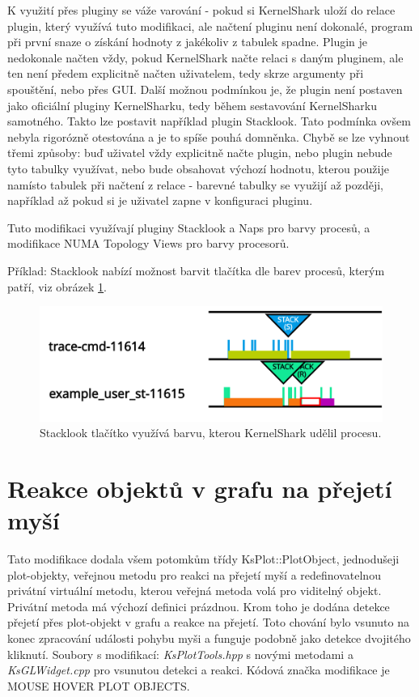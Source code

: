 K využití přes pluginy se váže varování - pokud si KernelShark uloží do relace plugin, který využívá tuto modifikaci, ale načtení pluginu není dokonalé, program při první snaze o získání hodnoty z jakékoliv z tabulek spadne. Plugin je nedokonale načten vždy, pokud KernelShark načte relaci s daným pluginem, ale ten není předem explicitně načten uživatelem, tedy skrze argumenty při spouštění, nebo přes GUI. Další možnou podmínkou je, že plugin není postaven jako oficiální pluginy KernelSharku, tedy během sestavování KernelSharku samotného. Takto lze postavit například plugin Stacklook. Tato podmínka ovšem nebyla rigorózně otestována a je to spíše pouhá domněnka. Chybě se lze vyhnout třemi způsoby: buď uživatel vždy explicitně načte plugin, nebo plugin nebude tyto tabulky využívat, nebo bude obsahovat výchozí hodnotu, kterou použije namísto tabulek při načtení z relace - barevné tabulky se využijí až později, například až pokud si je uživatel zapne v konfiguraci pluginu.

Tuto modifikaci využívají pluginy Stacklook a Naps pro barvy procesů, a modifikace NUMA Topology Views pro barvy procesorů.

Příklad: Stacklook nabízí možnost barvit tlačítka dle barev procesů, kterým patří, viz obrázek \ref{obr01:modif-get-colors}.

\begin{figure}[p]\centering
    \includegraphics[width=140mm]{img/modif-get-colors-traced.png}
    \caption{Stacklook tlačítko využívá barvu, kterou KernelShark udělil procesu.}
    \label{obr01:modif-get-colors}
\end{figure}

\section{Reakce objektů v grafu na přejetí myší}

Tato modifikace dodala všem potomkům třídy KsPlot::PlotObject, jednodušeji plot-objekty, veřejnou metodu pro reakci na přejetí myší a redefinovatelnou privátní virtuální metodu, kterou veřejná metoda volá pro viditelný objekt. Privátní metoda má výchozí definici prázdnou. Krom toho je dodána detekce přejetí přes plot-objekt v grafu a reakce na přejetí. Toto chování bylo vsunuto na konec zpracování události pohybu myši a funguje podobně jako detekce dvojitého kliknutí. Soubory s modifikací: \emph{KsPlotTools.hpp} s novými metodami a \emph{KsGLWidget.cpp} pro vsunutou detekci a reakci. Kódová značka modifikace je MOUSE HOVER PLOT OBJECTS.


